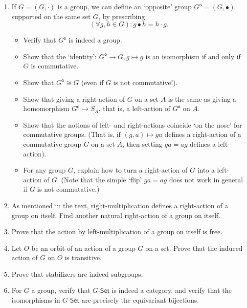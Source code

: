 \begin{enumerate}
    \item If $G = (G, \cdot)$ is a group, we can define an `opposite' group $G^\mathsf{o} = (G, \bullet)$ supported on the same set $G$, by prescribing
          \[ (\forall g, h \in G): g \bullet h = h \cdot g. \]
          \begin{itemize}
              \item Verify that $G^\mathsf{o}$ is indeed a group.
              \item Show that the `identity': $G^\mathsf{o} \to G, g \mapsto g$ is an isomorphism if and only if $G$ is commutative.
              \item Show that $G^\mathsf{o} \cong G$ (even if $G$ is not commutative!).
              \item Show that giving a right-action of $G$ on a set $A$ is the same as giving a homomorphism $G^\mathsf{o} \to S_A$, that is, a left-action of $G^\mathsf{o}$ on $A$.
              \item Show that the notions of left- and right-actions coincide `on the nose' for commutative groups. (That is, if $(g, a) \mapsto ga$ defines a right-action of a commutative group $G$ on a set $A$, then setting $ga = ag$ defines a left-action).
              \item For any group $G$, explain how to turn a right-action of $G$ into a left-action of $G$. (Note that the simple `flip' $ga = ag$ does not work in general if $G$ is not commutative.)
          \end{itemize}

    \item As mentioned in the text, right-multiplication defines a right-action of a group on itself. Find another natural right-action of a group on itself.

    \item Prove that the action by left-multiplication of a group on itself is free.

    \item Let $O$ be an orbit of an action of a group $G$ on a set. Prove that the induced action of $G$ on $O$ is transitive.

    \item Prove that stabilizers are indeed subgroups.

    \item For $G$ a group, verify that $G$-$\mathsf{Set}$ is indeed a category, and verify that the isomorphisms in $G$-$\mathsf{Set}$ are precisely the equivariant bijections.


\end{enumerate}
